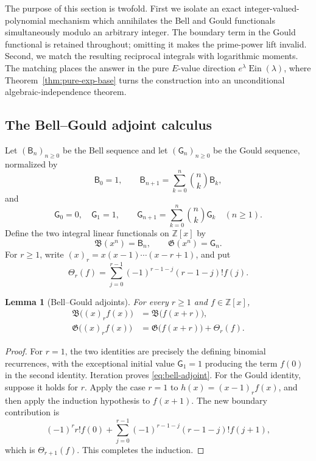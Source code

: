 \documentclass[11pt]{article}
\newtheorem{lemma}[theorem]{Lemma}
\theoremstyle{definition}
\theoremstyle{remark}
\newcommand{\Z}{\mathbb Z}
\newcommand{\Ein}{\operatorname{Ein}}
\begin{document}
The purpose of this section is twofold.  First we isolate an exact
integer-valued-polynomial mechanism which annihilates the Bell and Gould
functionals simultaneously modulo an arbitrary integer.  The boundary term
in the Gould functional is retained throughout; omitting it makes the
prime-power lift invalid.  Second, we match the resulting reciprocal
integrals with logarithmic moments.  The matching places the answer in the
pure \(E\)-value direction \(e^\lambda\Ein(\lambda)\), where
Theorem~\ref{thm:pure-exp-base} turns the construction into an unconditional
algebraic-independence theorem.

\subsection{The Bell--Gould adjoint calculus}

Let \((\mathsf B_n)_{n\geq0}\) be the Bell sequence and let
\((\mathsf G_n)_{n\geq0}\) be the Gould sequence, normalized by
\[
 \mathsf B_0=1,
 \qquad
 \mathsf B_{n+1}=\sum_{k=0}^n\binom nk\mathsf B_k,
\]
and
\[
 \mathsf G_0=0,
 \quad \mathsf G_1=1,
 \qquad
 \mathsf G_{n+1}=\sum_{k=0}^n\binom nk\mathsf G_k
 \quad(n\geq1).
\]
Define the two integral linear functionals on \(\Z[x]\) by
\[
 \mathfrak B(x^n)=\mathsf B_n,
 \qquad
 \mathfrak G(x^n)=\mathsf G_n.
\]
For \(r\geq1\), write
\((x)_r=x(x-1)\cdots(x-r+1)\), and put
\begin{equation}\label{eq:touchard-theta}
 \Theta_r(f)=
 \sum_{j=0}^{r-1}(-1)^{r-1-j}(r-1-j)!f(j).
\end{equation}

\begin{lemma}[Bell--Gould adjoints]
\label{lem:bell-gould-adjoints}
For every \(r\geq1\) and \(f\in\Z[x]\),
\begin{align}
 \mathfrak B\bigl((x)_rf(x)\bigr)
   &=\mathfrak B\bigl(f(x+r)\bigr),
   \label{eq:bell-adjoint}\\
 \mathfrak G\bigl((x)_rf(x)\bigr)
   &=\mathfrak G\bigl(f(x+r)\bigr)+\Theta_r(f).
   \label{eq:gould-adjoint}
\end{align}
\end{lemma}

\begin{proof}
For \(r=1\), the two identities are precisely the defining binomial
recurrences, with the exceptional initial value \(\mathsf G_1=1\) producing
the term \(f(0)\) in the second identity.  Iteration proves
\eqref{eq:bell-adjoint}.  For the Gould identity, suppose it holds for
\(r\).  Apply the case \(r=1\) to
\(h(x)=(x-1)_rf(x)\), and then apply the induction hypothesis to
\(f(x+1)\).  The new boundary contribution is
\[
 (-1)^rr!f(0)+
 \sum_{j=0}^{r-1}(-1)^{r-1-j}(r-1-j)!f(j+1),
\]
which is \(\Theta_{r+1}(f)\).  This completes the induction.
\end{proof}
\end{document}
